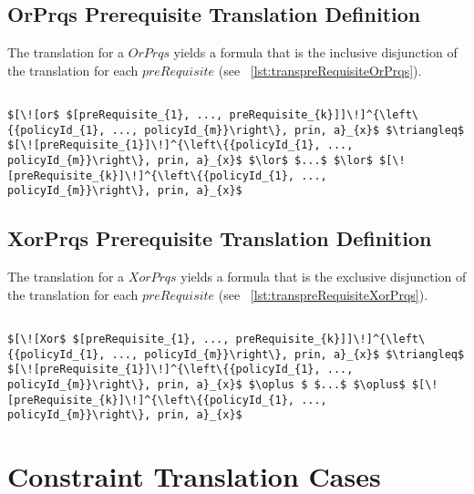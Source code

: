 \subsection{OrPrqs Prerequisite Translation Definition}
The translation for a $OrPrqs$ yields a formula that is the inclusive disjunction of the translation for each $preRequisite$ (see ~\ref{lst:transpreRequisiteOrPrqs}).

\lstset{mathescape, language=AST}  
\begin{lstlisting}[frame=single, caption={Prerequisite Translation Definition {$\colon$} Inclusive Disjunction},label={lst:transpreRequisiteOrPrqs}]

$[\![or$ $[preRequisite_{1}, ..., preRequisite_{k}]]\!]^{\left\{{policyId_{1}, ..., policyId_{m}}\right\}, prin, a}_{x}$ $\triangleq$ $[\![preRequisite_{1}]\!]^{\left\{{policyId_{1}, ..., policyId_{m}}\right\}, prin, a}_{x}$ $\lor$ $...$ $\lor$ $[\![preRequisite_{k}]\!]^{\left\{{policyId_{1}, ..., policyId_{m}}\right\}, prin, a}_{x}$

\end{lstlisting}

\subsection{XorPrqs Prerequisite Translation Definition}
The translation for a $XorPrqs$ yields a formula that is the exclusive disjunction of the translation for each $preRequisite$ (see ~\ref{lst:transpreRequisiteXorPrqs}).

\lstset{mathescape, language=AST}  
\begin{lstlisting}[frame=single, caption={Prerequisite Translation Definition {$\colon$} Exclusive Disjunction},label={lst:transpreRequisiteXorPrqs}]

$[\![Xor$ $[preRequisite_{1}, ..., preRequisite_{k}]]\!]^{\left\{{policyId_{1}, ..., policyId_{m}}\right\}, prin, a}_{x}$ $\triangleq$ $[\![preRequisite_{1}]\!]^{\left\{{policyId_{1}, ..., policyId_{m}}\right\}, prin, a}_{x}$ $\oplus $ $...$ $\oplus$ $[\![preRequisite_{k}]\!]^{\left\{{policyId_{1}, ..., policyId_{m}}\right\}, prin, a}_{x}$

\end{lstlisting}


\section{Constraint Translation Cases}\label{sec:constraintTransDefSec}

